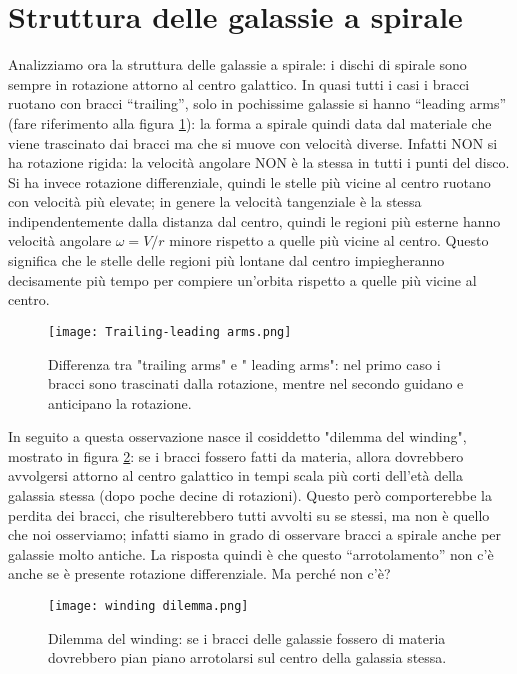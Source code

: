 \section{Struttura delle galassie a spirale}
Analizziamo ora la struttura delle galassie a spirale: i dischi di spirale sono sempre in rotazione attorno al centro galattico. In quasi tutti i casi i bracci ruotano con bracci “trailing”, solo in pochissime galassie si hanno “leading arms” (fare riferimento alla figura \ref{fig:trailing-leading arms}): la forma a spirale quindi data dal materiale che viene trascinato dai bracci ma che si muove con velocità diverse. Infatti NON si ha rotazione rigida: la velocità angolare NON è la stessa in tutti i punti del disco. Si ha invece rotazione differenziale, quindi le stelle più vicine al centro ruotano con velocità più elevate; in genere la velocità tangenziale è la stessa indipendentemente dalla distanza dal centro, quindi le regioni più esterne hanno velocità angolare $\omega = V/r$ minore rispetto a quelle più vicine al centro. Questo significa che le stelle delle regioni più lontane dal centro impiegheranno decisamente più tempo per compiere un'orbita rispetto a quelle più vicine al centro.

\begin{figure}
    \centering
    \texttt{[image: Trailing-leading arms.png]}
    \caption[width = 0.5 \textwidth]{Differenza tra "trailing arms" e " leading arms": nel primo caso i bracci sono trascinati dalla rotazione, mentre nel secondo guidano e anticipano la rotazione.}
    \label{fig:trailing-leading arms}
\end{figure}

In seguito a questa osservazione nasce il cosiddetto "dilemma del winding", mostrato in figura \ref{fig:winding-dilemma}: se i bracci fossero fatti da materia, allora dovrebbero avvolgersi attorno al centro galattico in tempi scala più corti dell’età della galassia stessa (dopo poche decine di rotazioni). Questo però comporterebbe la perdita dei bracci, che risulterebbero tutti avvolti su se stessi, ma non è quello che noi osserviamo; infatti siamo in grado di osservare bracci a spirale anche per galassie molto antiche. La risposta quindi è che questo “arrotolamento” non c’è anche se è presente rotazione differenziale. Ma perché non c'è?

\begin{figure}
    \centering
    \texttt{[image: winding dilemma.png]}
    \caption[width =\textwidth]{Dilemma del winding: se i bracci delle galassie fossero di materia dovrebbero pian piano arrotolarsi sul centro della galassia stessa.}
    \label{fig:winding-dilemma}
\end{figure}

